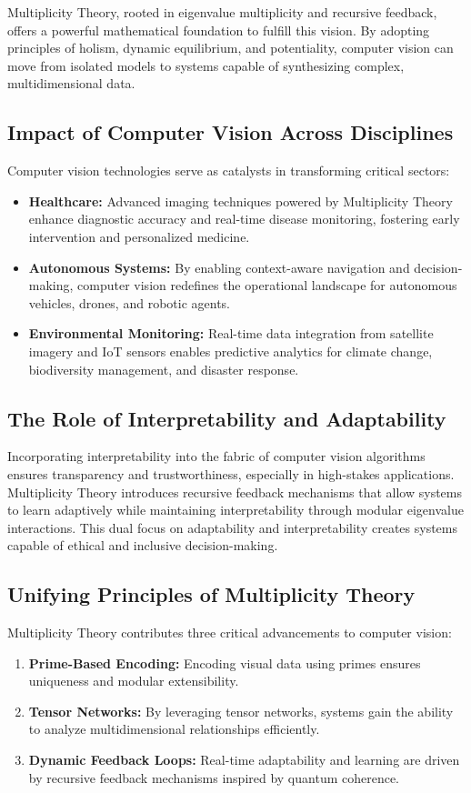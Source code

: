 \documentclass{article}
\theoremstyle{plain}
\begin{document}
Multiplicity Theory, rooted in eigenvalue multiplicity and recursive feedback, offers a powerful mathematical foundation to fulfill this vision. By adopting principles of holism, dynamic equilibrium, and potentiality, computer vision can move from isolated models to systems capable of synthesizing complex, multidimensional data.

\subsection{Impact of Computer Vision Across Disciplines}
Computer vision technologies serve as catalysts in transforming critical sectors:
\begin{itemize}
    \item \textbf{Healthcare:} Advanced imaging techniques powered by Multiplicity Theory enhance diagnostic accuracy and real-time disease monitoring, fostering early intervention and personalized medicine.
    \item \textbf{Autonomous Systems:} By enabling context-aware navigation and decision-making, computer vision redefines the operational landscape for autonomous vehicles, drones, and robotic agents.
    \item \textbf{Environmental Monitoring:} Real-time data integration from satellite imagery and IoT sensors enables predictive analytics for climate change, biodiversity management, and disaster response.
\end{itemize}

\subsection{The Role of Interpretability and Adaptability}
Incorporating interpretability into the fabric of computer vision algorithms ensures transparency and trustworthiness, especially in high-stakes applications. Multiplicity Theory introduces recursive feedback mechanisms that allow systems to learn adaptively while maintaining interpretability through modular eigenvalue interactions. This dual focus on adaptability and interpretability creates systems capable of ethical and inclusive decision-making.

\subsection{Unifying Principles of Multiplicity Theory}
Multiplicity Theory contributes three critical advancements to computer vision:
\begin{enumerate}
    \item \textbf{Prime-Based Encoding:} Encoding visual data using primes ensures uniqueness and modular extensibility.
    \item \textbf{Tensor Networks:} By leveraging tensor networks, systems gain the ability to analyze multidimensional relationships efficiently.
    \item \textbf{Dynamic Feedback Loops:} Real-time adaptability and learning are driven by recursive feedback mechanisms inspired by quantum coherence.
\end{enumerate}
\end{document}
